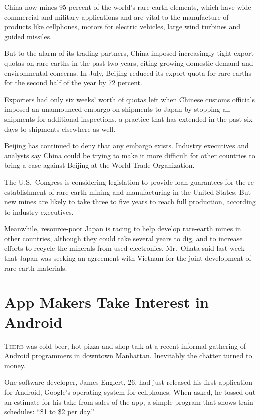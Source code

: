 ﻿\documentclass[12pt]{article}
\begin{document}
China now mines 95 percent of the world's rare earth elements, which have wide commercial and
military applications and are vital to the manufacture of products like cellphones, motors for
electric vehicles, large wind turbines and guided missiles.

But to the alarm of its trading partners, China imposed increasingly tight export quotas on rare
earths in the past two years, citing growing domestic demand and environmental concerns. In July,
Beijing reduced its export quota for rare earths for the second half of the year by 72 percent.

Exporters had only six weeks' worth of quotas left when Chinese customs officials imposed an
unannounced embargo on shipments to Japan by stopping all shipments for additional inspections, a
practice that has extended in the past six days to shipments elsewhere as well.

Beijing has continued to deny that any embargo exists. Industry executives and analysts say China
could be trying to make it more difficult for other countries to bring a case against Beijing at the
World Trade Organization.

The U.S.~Congress is considering legislation to provide loan guarantees for the re-establishment of
rare-earth mining and manufacturing in the United States. But new mines are likely to take three to
five years to reach full production, according to industry executives.

Meanwhile, resource-poor Japan is racing to help develop rare-earth mines in other countries,
although they could take several years to dig, and to increase efforts to recycle the minerals from
used electronics. Mr.~Ohata said last week that Japan was seeking an agreement with Vietnam for the
joint development of rare-earth materials.

\section{App Makers Take Interest in Android}

\lettrine{T}{here} was cold beer, hot pizza and shop talk at a recent
informal gathering of Android programmers in downtown Manhattan. Inevitably the chatter turned to
money.

One software developer, James Englert, 26, had just released his first application for Android,
Google's operating system for cellphones. When asked, he tossed out an estimate for his take from
sales of the app, a simple program that shows train schedules: ``\$1 to \$2 per day.''
\end{document}
